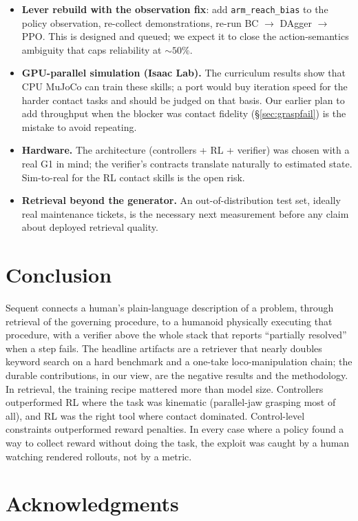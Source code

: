 \documentclass[11pt]{article}
\begin{document}
\begin{itemize}[nosep]
  \item \textbf{Lever rebuild with the observation fix}: add \texttt{arm\_reach\_bias} to the policy observation, re-collect demonstrations, re-run BC $\to$ DAgger $\to$ PPO. This is designed and queued; we expect it to close the action-semantics ambiguity that caps reliability at ${\sim}50\%$.
  \item \textbf{GPU-parallel simulation (Isaac Lab).} The curriculum results show that CPU MuJoCo can train these skills; a port would buy iteration speed for the harder contact tasks and should be judged on that basis. Our earlier plan to add throughput when the blocker was contact fidelity (\S\ref{sec:graspfail}) is the mistake to avoid repeating.
  \item \textbf{Hardware.} The architecture (controllers + RL + verifier) was chosen with a real G1 in mind; the verifier's contracts translate naturally to estimated state. Sim-to-real for the RL contact skills is the open risk.
  \item \textbf{Retrieval beyond the generator.} An out-of-distribution test set, ideally real maintenance tickets, is the necessary next measurement before any claim about deployed retrieval quality.
\end{itemize}

\section{Conclusion}

Sequent connects a human's plain-language description of a problem, through retrieval of the governing procedure, to a humanoid physically executing that procedure, with a verifier above the whole stack that reports ``partially resolved'' when a step fails. The headline artifacts are a retriever that nearly doubles keyword search on a hard benchmark and a one-take loco-manipulation chain; the durable contributions, in our view, are the negative results and the methodology. In retrieval, the training recipe mattered more than model size. Controllers outperformed RL where the task was kinematic (parallel-jaw grasping most of all), and RL was the right tool where contact dominated. Control-level constraints outperformed reward penalties. In every case where a policy found a way to collect reward without doing the task, the exploit was caught by a human watching rendered rollouts, not by a metric.

\section*{Acknowledgments}
\end{document}
